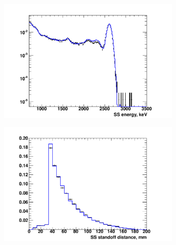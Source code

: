 \documentclass[herrin-thesis.tex]{subfiles}
\begin{document}
\begin{figure}[htbp]
\centering
	\begin{subfigure}[c]{0.48\textwidth}
	\centering
	\includegraphics[trim = 1.8cm 0cm 1.5cm 1cm, clip=true, width=\textwidth]{./plots/analysis_shape_agreement_E_ThS5SSlog.pdf}
	\end{subfigure}\hfill%
	\begin{subfigure}[c]{0.48\textwidth}
	\centering
	\includegraphics[trim = 1.8cm 0cm 1.5cm 1cm, clip=true, width=\textwidth]{./plots/analysis_shape_agreement_sd_ThS5SSlin.pdf}
	\end{subfigure}
	\begin{subfigure}[c]{0.48\textwidth}
	\centering

\end{subfigure}
\end{figure}
\end{document}
